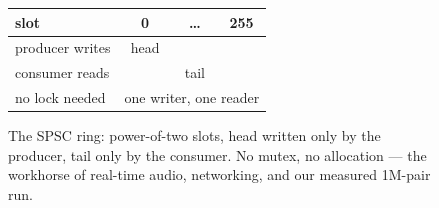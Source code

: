 \begin{figure}[htbp]
\centering
\begin{tabular}{l|ccc}
\toprule
slot & 0 & \dots & 255 \\
\midrule
producer writes & head & & \\
consumer reads & & tail & \\
no lock needed & \multicolumn{3}{c}{one writer, one reader} \\
\bottomrule
\end{tabular}
\caption{The SPSC ring: power-of-two slots, head written only by the
producer, tail only by the consumer. No mutex, no allocation ---
the workhorse of real-time audio, networking, and our measured
1M-pair run.}
\label{fig:ring17}
\end{figure}
